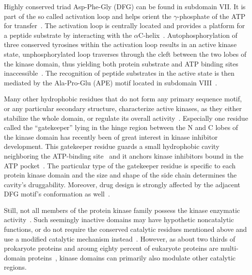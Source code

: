   Highly conserved triad Asp-Phe-Gly (DFG) can be found in subdomain VII.
  It is part of the so called activation loop and helps orient the $\gamma$-phosphate of
  the ATP for transfer~\cite{hanks1995eukaryotic}.
  The activation loop is centrally located and provides a platform for a peptide
  substrate by interacting with the
  $\alpha$C-helix~\cite{huse2002conformational, mobitz2015abc}.
  Autophosphorylation of three conserved tyrosines within the activation loop results in
  an active kinase state, unphosphorylated loop traverses through the cleft between
  the two lobes of the kinase domain, thus yielding both protein substrate and ATP binding
  sites inaccessible~\cite{hubbard1997crystal}.
  The recognition of peptide substrates in the active state is then mediated by the
  Ala-Pro-Glu (APE) motif located in subdomain VIII~\cite{hanks1995eukaryotic}.

  Many other hydrophobic residues that do not form any primary sequence motif, or any
  particular secondary structure, characterize active kinases, as they either stabilize
  the whole domain, or regulate its overall
  activity~\cite{kornev2006surface, kornev2010defining}.
  Especially one residue called the ``gatekeeper'' lying in the hinge region between the N
  and C lobes of the kinase domain has recently been of great interest in kinase inhibitor
  development.
  This gatekeeper residue guards a small hydrophobic cavity neighboring the ATP-binding
  site~\cite{noble2004protein} and it anchors kinase inhibitors bound in the ATP
  pocket~\cite{tong1997highly, azam2008activation}.
  The particular type of the gatekeeper residue is specific to each protein kinase domain
  and the size and shape of the side chain determines the cavity's druggability.
  Moreover, drug design is strongly affected by the adjacent DFG motif's conformation as
  well~\cite{zuccotto2010through}.

  Still, not all members of the protein kinase family possess the kinase enzymatic
  activity~\cite{zervas2002integrin, morrison2001ksr, kroiher2001deceiving}.
  Such seemingly inactive domains may have hypothetic noncatalytic functions, or do not
  require the conserved catalytic residues mentioned above and use a modified catalytic
  mechanism instead~\cite{manning2002protein}.
  However, as about two thirds of prokaryote proteins and aroung eighty percent of
  eukaryote proteins are multi-domain
  proteins~\cite{teichmann1998structural, gerstein1998representative}, kinase domains can
  primarily also modulate other catalytic regions.

